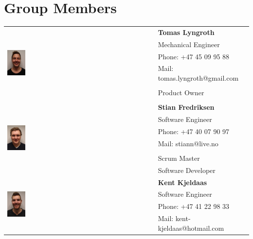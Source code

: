 \section{Group Members}
    \begin{center}
    \begin{tabular}{|l|l|}\hline 
\multirow{7}{*}{\includegraphics[width = 0.125\textwidth]{VAPIQ-PICTURES/tomas}} &  \textbf{Tomas Lyngroth}  \\
 & Mechanical Engineer  \\
 & Phone: +47 45 09 95 88  \\
 & Mail: tomas.lyngroth@gmail.com  \\
 &   \\
 &  Product Owner \\
 & \\ \hline
 \multirow{7}{*}{\includegraphics[width = 0.125\textwidth]{VAPIQ-PICTURES/stian}} & \textbf{Stian Fredriksen}  \\
 & Software Engineer  \\
 & Phone: +47 40 07 90 97  \\
 & Mail: stiann@live.no  \\
 &   \\
 & Scrum Master  \\
 & Software Developer  \\ \hline
 \multirow{7}{*}{\includegraphics[width = 0.125\textwidth]{VAPIQ-PICTURES/kent}} & \textbf{Kent Kjeldaas}  \\
 & Software Engineer  \\
 & Phone: +47 41 22 98 33  \\
 & Mail: kent-kjeldaas@hotmail.com  \\

\end{tabular}
\end{center}
